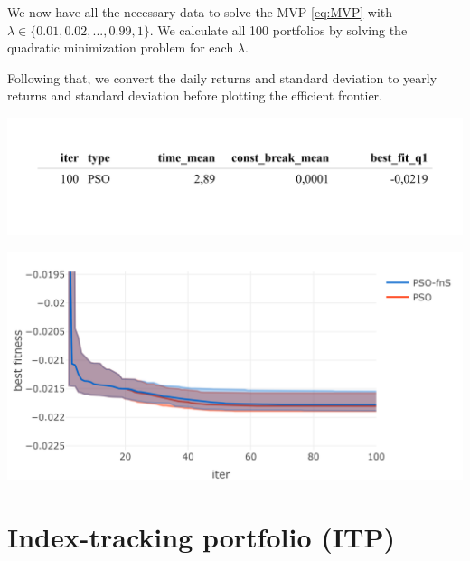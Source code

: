 \documentclass[
  oneside]{book}
\begin{document}
We now have all the necessary data to solve the MVP \eqref{eq:MVP} with \(\lambda \in \{0.01, 0.02, ..., 0.99, 1\}\). We calculate all 100 portfolios by solving the quadratic minimization problem for each \(\lambda\).

Following that, we convert the daily returns and standard deviation to yearly returns and standard deviation before plotting the efficient frontier.

\includegraphics{Master_Thesis_files/figure-latex/unnamed-chunk-9-1.png}

\includegraphics{Master_Thesis_files/figure-latex/unnamed-chunk-10-1.png}

\hypertarget{index-tracking-portfolio-itp}{%
\section{Index-tracking portfolio (ITP)}\label{index-tracking-portfolio-itp}}
\end{document}
